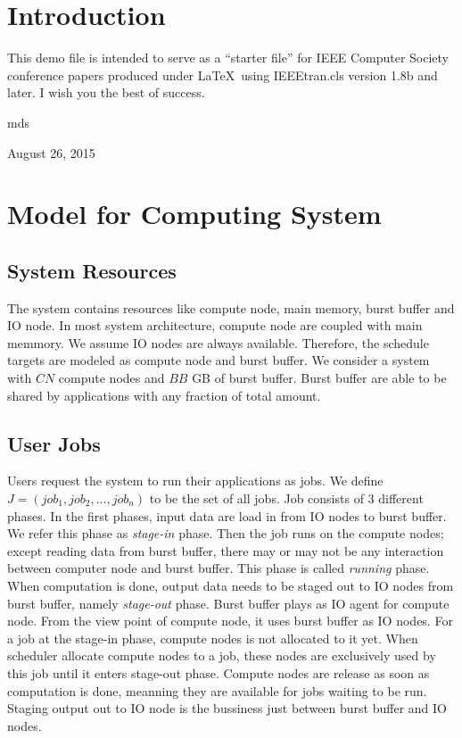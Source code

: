 \documentclass[conference,compsoc]{IEEEtran}
\begin{document}
\section{Introduction}
This demo file is intended to serve as a ``starter file''
for IEEE Computer Society conference papers produced under \LaTeX\ using
IEEEtran.cls version 1.8b and later.
I wish you the best of success.

\hfill mds
 
\hfill August 26, 2015

\section{Model for Computing System}
\subsection{System Resources}
The system contains resources like compute node, main memory, burst buffer and IO node.
In most system architecture, compute node are coupled with main memmory.
We assume IO nodes are always available.
Therefore, the schedule targets are modeled as compute node and burst buffer.
We consider a system with $CN$ compute nodes and $BB$ GB of burst buffer.
Burst buffer are able to be shared by applications with any fraction of total amount.

\subsection{User Jobs}
Users request the system to run their applications as jobs.
We define $J = (job_1, job_2,..., job_n)$ to be the set of all jobs.
Job consists of 3 different phases.
In the first phases, input data are load in from IO nodes to burst buffer.
We refer this phase as \textit{stage-in} phase.
Then the job runs on the compute nodes;
except reading data from burst buffer, there may or may not be any interaction between computer node and burst buffer.
This phase is called \textit{running} phase.
When computation is done, output data needs to be staged out to IO nodes from burst buffer, namely \textit{stage-out} phase.
Burst buffer plays as IO agent for compute node.
From the view point of compute node, it uses burst buffer as IO nodes.
For a job at the stage-in phase, compute nodes is not allocated to it yet.
When scheduler allocate compute nodes to a job, these nodes are exclusively used by this job until it enters stage-out phase.
Compute nodes are release as soon as computation is done, meanning they are available for jobs waiting to be run.
Staging output out to IO node is the bussiness just between burst buffer and IO nodes.
\end{document}
